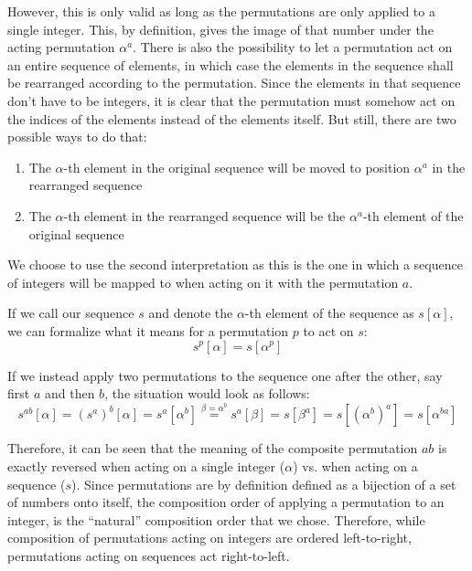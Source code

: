 \documentclass[parskip=half]{scrartcl}
\begin{document}
	However, this is only valid as long as the permutations are only applied to a single integer. This, by definition, gives the image of that number
	under the acting permutation $\alpha^a$. There is also the possibility to let a permutation act on an entire sequence of elements, in which case
	the elements in the sequence shall be rearranged according to the permutation. Since the elements in that sequence don't have to be integers, it
	is clear that the permutation must somehow act on the indices of the elements instead of the elements itself. But still, there are two possible
	ways to do that:
	\begin{enumerate}
		\item The $\alpha$-th element in the original sequence will be moved to position $\alpha^a$ in the rearranged sequence
		\item The $\alpha$-th element in the rearranged sequence will be the $\alpha^a$-th element of the original sequence
	\end{enumerate}

	We choose to use the second interpretation as this is the one in which a sequence of integers  will be mapped to
	 when acting on it with the permutation $a$.

	If we call our sequence $s$ and denote the $\alpha$-th element of the sequence as $s[\alpha]$, we can formalize what it means for a permutation
	$p$ to act on $s$:
	\begin{equation}
		s^p[\alpha] = s[\alpha^p]
	\end{equation}

	If we instead apply two permutations to the sequence one after the other, say first $a$ and then $b$, the situation would look as follows:
	\begin{equation}
		s^{ab}[\alpha] = \left( s^a \right)^b[\alpha] = s^a[\alpha^b] \overset{\beta=\alpha^b}{=} s^a[\beta] = s[\beta^a]
		= s[(\alpha^b)^a] = s[\alpha^{ba}]
	\end{equation}

	Therefore, it can be seen that the meaning of the composite permutation $ab$ is exactly reversed when acting on a single integer ($\alpha$) vs.
	when acting on a sequence ($s$). Since permutations are by definition defined as a bijection of a set of numbers onto itself, the composition
	order of applying a permutation to an integer, is the \enquote{natural} composition order that we chose. Therefore, while composition of
	permutations acting on integers are ordered left-to-right, permutations acting on sequences act right-to-left.
\end{document}
